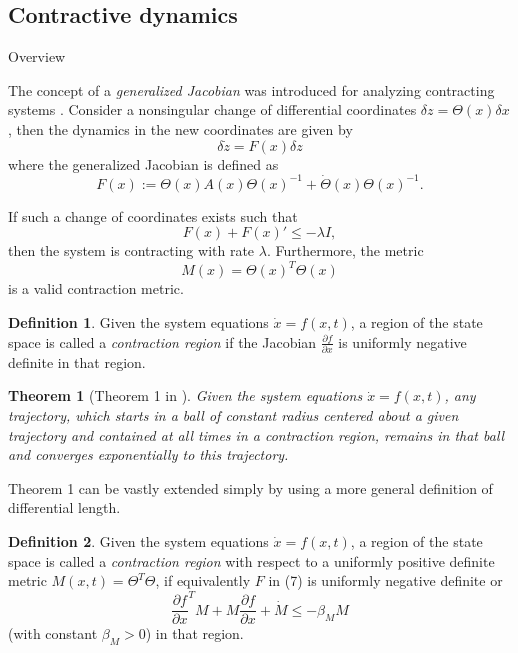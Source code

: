 \documentclass{article}
\newtheorem{theorem}{Theorem}
\theoremstyle{definition} \newtheorem{definition}{Definition}
\theoremstyle{remark} \newtheorem{remark}{Remark}
\newcounter{ct}
\begin{document}
\subsection{Contractive dynamics}\label{sec:contractive}

Overview \citep{aminzare2014contraction, tsukamoto2021contraction}

The concept of a \textit{generalized Jacobian} was introduced for analyzing contracting systems \citep{lohmiller1998contraction}.
Consider a nonsingular change of differential coordinates \( \delta z = \Theta(x) \delta x \), then the dynamics in the new coordinates are given by
\[
\delta\dot{ z} = F(x) \delta z
\]
where the generalized Jacobian is defined as
\[
F(x) := \Theta(x) A(x) \Theta(x)^{-1} + \dot{\Theta}(x) \Theta(x)^{-1}.
\]

If such a change of coordinates exists such that
\[
F(x) + F(x)' \leq -\lambda I,
\]
then the system is contracting with rate \( \lambda \). Furthermore, the metric
\[
M(x) = \Theta(x)^T \Theta(x)
\]
is a valid contraction metric.

\begin{definition}
Given the system equations \(\dot{x} = f(x, t)\), a region of the state space is called a \textit{contraction region} if the Jacobian \(\frac{\partial f}{\partial x}\) is uniformly negative definite in that region.
\end{definition}

\begin{theorem}[Theorem 1 in \citep{lohmiller1998contraction}]\label{thrm:contractive_ball}
Given the system equations  $\dot x = f(x, t)$, any trajectory, which starts in a ball of constant radius centered about a given trajectory and contained at all times in a contraction region, remains in that ball and converges exponentially to this trajectory.
\end{theorem}

Theorem 1 can be vastly extended simply by using a more general definition of differential length.


\begin{definition}
Given the system equations \(\dot{x} = f(x, t)\), a region of the state space is called a \textit{contraction region} with respect to a uniformly positive definite metric \( M(x, t) = \Theta^T \Theta \), if equivalently \( F \) in (7) is uniformly negative definite or  
\[
\frac{\partial f}{\partial x}^T M + M \frac{\partial f}{\partial x} + \dot{M} \leq -\beta_M M
\]
(with constant \( \beta_M > 0 \)) in that region.
\end{definition}
\end{document}
